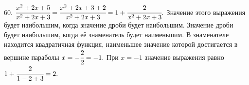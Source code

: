 60. $\cfrac{x^2+2x+5}{x^2+2x+3}=\cfrac{x^2+2x+3+2}{x^2+2x+3}=1+\cfrac{2}{x^2+2x+3}.$ Значение этого выражения будет наибольшим, когда значение дроби будет наибольшим. Значение дроби будет наибольшим, когда её знаменатель будет наименьшим. В знаменателе находится квадратичная функция, наименьшее значение которой достигается в вершине параболы $x=-\cfrac{2}{2}=-1.$ При $x=-1$ значение выражения равно $1+\cfrac{2}{1-2+3}=2.$\\
